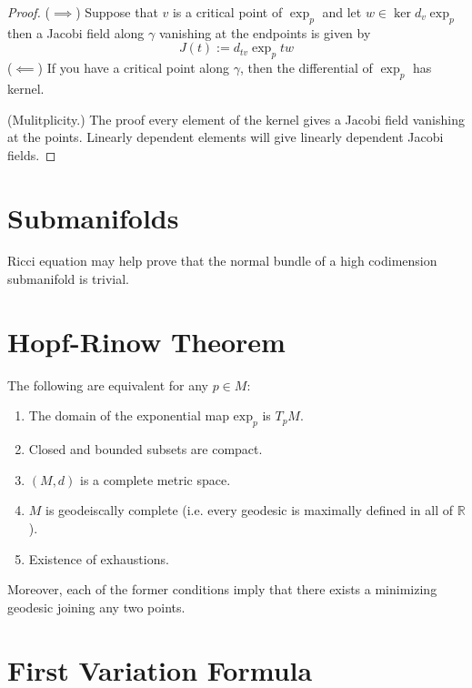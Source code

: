 \begin{proof}
($\implies$) Suppose that $v$ is a critical point of $\operatorname{exp}_p$ and 
let $w \in \ker d_v \operatorname{exp}_p$ then a Jacobi field along $\gamma$ 
vanishing at the endpoints is given by
$$
J(t):=d_{tv}\operatorname{exp}_ptw
$$
($\impliedby$) If you have a critical point along $\gamma$, then the 
differential of $\operatorname{exp}_p$ has kernel.

(Mulitplicity.) The proof every element of the kernel gives a Jacobi
 field vanishing at the points. Linearly dependent elements will give 
 linearly dependent Jacobi fields.
\end{proof}
\section{Submanifolds}
\label{section-submanifolds}

\begin{remark}
\label{remark-ricci-equation}
Ricci equation may help prove that the normal bundle of a high codimension
submanifold is trivial.
\end{remark}

\section{Hopf-Rinow Theorem}
\label{section-Hopf-Rinow-theorem}

\begin{theorem}
\label{theorem-Hopf-Rinow}
The following are equivalent for any $p \in M$:
\begin{enumerate}
\item The domain of the exponential map $\text{exp}_p$ is $T_pM$.
\item Closed and bounded subsets are compact.
\item $(M,d)$ is a complete metric space.
\item $M$ is geodeiscally complete (i.e. every geodesic is maximally defined in
all of $\mathbb{R}$).
\item Existence of exhaustions.
\end{enumerate}
Moreover, each of the former conditions imply that there exists a minimizing 
geodesic joining any two points.
\end{theorem}
\section{First Variation Formula}
\label{section-first-variation}

